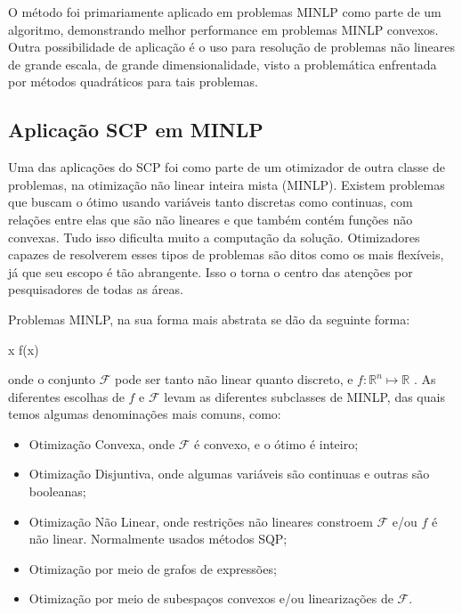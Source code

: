 O método foi primariamente aplicado em problemas MINLP como parte de um algoritmo,
demonstrando melhor performance em problemas MINLP convexos. Outra possibilidade de
aplicação é o uso para resolução de problemas não lineares de grande escala, de grande
dimensionalidade, visto a problemática enfrentada por métodos quadráticos para tais
problemas.



\subsection{Aplicação SCP em MINLP}
Uma das aplicações do SCP foi como parte de um otimizador de outra classe de problemas, na
otimização não linear inteira mista (MINLP). Existem problemas que buscam o ótimo usando
variáveis tanto discretas como continuas, com relações entre elas que são não lineares e
que também contém funções não convexas. Tudo isso dificulta muito a computação da solução.
Otimizadores capazes de resolverem esses tipos de problemas são ditos como os mais flexíveis,
já que seu escopo é tão abrangente. Isso o torna o centro das atenções por pesquisadores de
todas as áreas.

Problemas MINLP, na sua forma mais abstrata se dão da seguinte forma:

\vspace{-15pt}
\begin{mini!}
{x}{ f(x) \label{minlp_obj}}{\label{prob_minlp}}{}
\end{mini!}
onde o conjunto \( \mathcal{F} \) pode ser tanto não linear quanto discreto, e \( f: \mathbb{R}^n \mapsto \mathbb{R}\) .
As diferentes escolhas
de \(f\) e \(\mathcal{F}\) levam as diferentes subclasses de MINLP, das quais temos algumas
denominações mais comuns, como:

\begin{itemize}
\item Otimização Convexa, onde \( \mathcal{F} \) é convexo, e o ótimo é inteiro;
\item Otimização Disjuntiva, onde algumas variáveis são continuas e outras são booleanas;
\item Otimização Não Linear, onde restrições não lineares constroem \(\mathcal{F}\) e/ou \(f\) é não linear. Normalmente usados métodos SQP;
\item Otimização por meio de grafos de expressões;
\item Otimização por meio de subespaços convexos e/ou linearizações de \(\mathcal{F}\).
\end{itemize}

